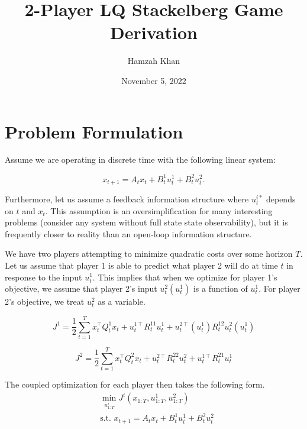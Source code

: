 \documentclass[11pt]{article}
\title{2-Player LQ Stackelberg Game Derivation}
\author{Hamzah Khan} \date{November 5, 2022}
\newcommand{\T}{\intercal}
\begin{document}
\maketitle

\section{Problem Formulation}
Assume we are operating in discrete time with the following linear system:

\begin{equation}
\label{eq:2p-dynamics}
x_{t+1} = A_t x_t + B^{1}_t u^{1}_t + B^{2}_t u^{2}_t.
\end{equation}


Furthermore, let us assume a feedback information structure where $u^{i*}_t$ depends on $t$ and $x_t$. This assumption is an oversimplification for many interesting problems (consider any system without full state state observability), but it is frequently closer to reality than an open-loop information structure.

We have two players attempting to minimize quadratic costs over some horizon $T$. Let us assume that player 1 is able to predict what player 2 will do at time $t$ in response to the input $u^1_t$. This implies that when we optimize for player 1's objective, we assume that player 2's input $u^2_t(u^1_t)$ is a function of $u^1_t$. For player 2's objective, we treat $u^2_t$ as a variable.

\begin{equation}
\label{eq:p1-objective}
J^1 = \frac{1}{2} \sum_{t=1}^T x^\T_t Q^1_t x_t + u^{1\T}_t R^{11}_t u^1_t + u^{2\T}_t(u^1_t) R^{12}_t u^2_t(u^1_t)
\end{equation}

\begin{equation}
\label{eq:p2-objective}
J^2 = \frac{1}{2} \sum_{t=1}^T x^\T_t Q^2_t x_t + u^{2\T}_t R^{22}_t u^2_t + u^{1\T}_t R^{21}_t u^1_t
\end{equation}

The coupled optimization for each player then takes the following form.
\begin{equation}
\label{eq:optim-problem}
\begin{split}
& \min_{u^{i}_{1:T}} J^i\left(x_{1:T}, u^1_{1:T}, u^2_{1:T} \right) \\
& \text{s.t. } x_{t+1} = A_t x_t + B^{1}_t u^{1}_t + B^{2}_t u^{2}_t
\end{split}
\end{equation}
\end{document}
